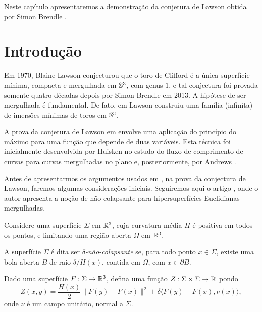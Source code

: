 Neste capítulo apresentaremos a demonstração da conjetura de
Lawson obtida por Simon Brendle \cite{Brendle2013a}.


\section{Introdu\c c\~ao}

Em 1970, Blaine Lawson \cite{Lawson1970a} conjecturou que o toro de 
Clifford é a única superfície mínima, compacta e mergulhada em $\mathbb{S}^3$,
com genus $1$, e tal conjectura foi provada somente quatro décadas depois por Simon
Brendle \cite{Brendle2013a} em 2013. A hipótese de ser mergulhada é
fundamental. De fato, em \cite{Lawson1970} Lawson construiu uma 
família (infinita) de imersões mínimas de toros em $\mathbb{S}^3$.

A prova da conjetura de Lawson em \cite{Brendle2013a} envolve uma 
aplicação do princípio do máximo para uma função que depende de 
duas vari\'aveis. Esta técnica foi inicialmente desenvolvida por Huisken
\cite{Huisken1998} no estudo do fluxo de comprimento de curvas para 
curvas mergulhadas no plano e, posteriormente, por Andrews 
\cite{Andrews2012}.

Antes de apresentarmos os argumentos usados em \cite{Brendle2013a},
na prova da conjectura de Lawson, faremos algumas considera\c c\~oes
iniciais. Seguiremos aqui o artigo \cite{Andrews2012}, onde o autor
apresenta a no\c c\~ao de n\~ao-colapsante para hipersuperf\'icies
Euclidianas mergulhadas.

Considere uma superf\'icie $\Sigma$ em $\mathbb{R}^3$, cuja curvatura
m\'edia $H$ \'e positiva em todos os pontos, e limitando uma 
regi\~ao aberta $\Omega$ em $\mathbb{R}^3$.

\begin{definicao}
A superf\'icie $\Sigma$ \'e dita ser {\em $\delta$-n\~ao-colapsante}
se, para todo ponto $x\in\Sigma$, existe uma bola aberta $B$ de
raio $\delta/H(x)$, contida em $\Omega$, com $x\in\partial B$. 
\end{definicao}

Dado uma superf\'icie $F:\Sigma\to\mathbb{R}^3$, defina uma fun\c c\~ao
$Z:\Sigma\times\Sigma\to\mathbb{R}$ pondo
\[
Z(x,y) = \frac{H(x)}{2}\|F(y)-F(x)\|^2 + \delta\langle F(y)-F(x), \nu(x)\rangle,
\]
onde $\nu$ \'e um campo unit\'ario, normal a $\Sigma$.

